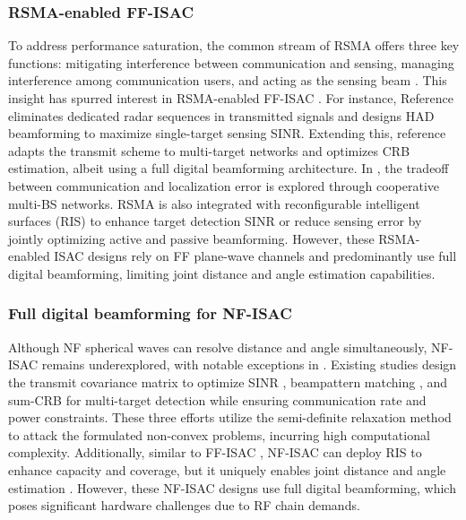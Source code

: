 \documentclass[10pt,journal,twocolumn]{IEEEtran}
\begin{document}
\subsubsection{RSMA-enabled FF-ISAC} To address performance saturation, the common stream of RSMA offers three key functions: mitigating interference between communication and sensing, managing interference among communication users, and acting as the sensing beam \cite{9531484}. This insight has spurred interest in RSMA-enabled FF-ISAC \cite{gong2024hybrid,10486996,10032141,10522473,10287099}. For instance, Reference \cite{gong2024hybrid} eliminates dedicated radar sequences in transmitted signals and designs HAD beamforming to maximize single-target sensing SINR. Extending this, reference \cite{10486996} adapts the transmit scheme to multi-target networks and optimizes CRB estimation, albeit using a full digital beamforming architecture. In \cite{10032141}, the tradeoff between communication and localization error is explored through cooperative multi-BS networks. RSMA is also integrated with reconfigurable intelligent surfaces (RIS) to enhance target detection SINR \cite{10287099} or reduce sensing error \cite{10522473} by jointly optimizing active and passive beamforming. However, these RSMA-enabled ISAC designs rely on FF plane-wave channels and predominantly use full digital beamforming, limiting joint distance and angle estimation capabilities.

\subsubsection{Full digital beamforming for NF-ISAC}
Although NF spherical waves can resolve distance and angle simultaneously, NF-ISAC remains underexplored, with notable exceptions in \cite{10520715,10694020,hua2024near,10681603,10135096,meng2024hybrid,10700785,10579914}. Existing studies design the transmit covariance matrix to optimize SINR \cite{10520715}, beampattern matching \cite{10694020}, and sum-CRB \cite{hua2024near} for multi-target detection while ensuring communication rate and power constraints. These three efforts utilize the semi-definite relaxation method to attack the formulated non-convex problems, incurring high computational complexity\cite{10520715,10694020,hua2024near}. Additionally, similar to FF-ISAC \cite{10287099,10522473}, NF-ISAC can deploy RIS to enhance capacity and coverage, but it uniquely enables joint distance and angle estimation \cite{10681603}. However, these NF-ISAC designs use full digital beamforming, which poses significant hardware challenges due to RF chain demands. 
\end{document}
